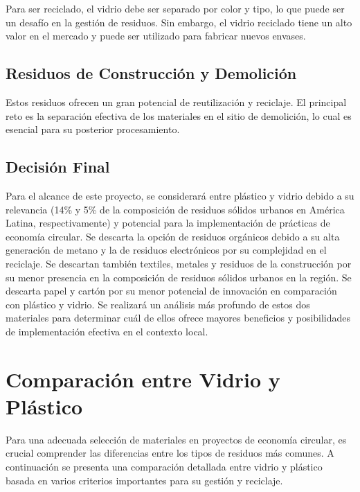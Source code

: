 \documentclass[main.tex]{subfiles}
\begin{document}
Para ser reciclado, el vidrio debe ser separado por color y tipo, lo que puede ser un desafío en la gestión de residuos. Sin embargo, el vidrio reciclado tiene un alto valor en el mercado y puede ser utilizado para fabricar nuevos envases.

\subsection{Residuos de Construcción y Demolición}
Estos residuos ofrecen un gran potencial de reutilización y reciclaje. El principal reto es la separación efectiva de los materiales en el sitio de demolición, lo cual es esencial para su posterior procesamiento.

\subsection{Decisión Final}
Para el alcance de este proyecto, se considerará entre plástico y vidrio debido a su relevancia (14\% y 5\% de la composición de residuos sólidos urbanos en América Latina, respectivamente) y potencial para la implementación de prácticas de economía circular. Se descarta la opción de residuos orgánicos debido a su alta generación de metano y la de residuos electrónicos por su complejidad en el reciclaje. Se descartan también textiles, metales y residuos de la construcción por su menor presencia en la composición de residuos sólidos urbanos en la región. Se descarta papel y cartón por su menor potencial de innovación en comparación con plástico y vidrio.
Se realizará un análisis más profundo de estos dos materiales para determinar cuál de ellos ofrece mayores beneficios y posibilidades de implementación efectiva en el contexto local.

\section{Comparación entre Vidrio y Plástico}

Para una adecuada selección de materiales en proyectos de economía circular, es crucial comprender las diferencias entre los tipos de residuos más comunes. A continuación se presenta una comparación detallada entre vidrio y plástico basada en varios criterios importantes para su gestión y reciclaje.
\end{document}
